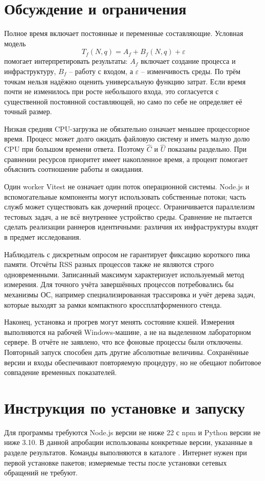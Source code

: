 \section{Обсуждение и ограничения}
Полное время включает постоянные и переменные составляющие. Условная модель
\[
 T_f(N,q)=A_f+B_f(N,q)+\varepsilon
\]
помогает интерпретировать результаты: $A_f$ включает создание процесса и инфраструктуру, $B_f$ -- работу с входом, а $\varepsilon$ -- изменчивость среды. По трём точкам нельзя надёжно оценить универсальную функцию затрат. Если время почти не изменилось при росте небольшого входа, это согласуется с существенной постоянной составляющей, но само по себе не определяет её точный размер.

Низкая средняя CPU-загрузка не обязательно означает меньшее процессорное время. Процесс может долго ожидать файловую систему и иметь малую долю CPU при большом времени ответа. Поэтому $\widehat C$ и $\widehat U$ показаны раздельно. При сравнении ресурсов приоритет имеет накопленное время, а процент помогает объяснить соотношение работы и ожидания.

Один worker Vitest не означает один поток операционной системы. Node.js и вспомогательные компоненты могут использовать собственные потоки; часть служб может существовать как дочерний процесс. Ограничивается параллелизм тестовых задач, а не всё внутреннее устройство среды. Сравнение не пытается сделать реализации раннеров идентичными: различия их инфраструктуры входят в предмет исследования.

Наблюдатель с дискретным опросом не гарантирует фиксацию короткого пика памяти. Отсчёты RSS разных процессов также не являются строго одновременными. Записанный максимум характеризует используемый метод измерения. Для точного учёта завершённых процессов потребовались бы механизмы ОС, например специализированная трассировка и учёт дерева задач, которые выходят за рамки компактного кроссплатформенного стенда.

Наконец, установка и прогрев могут менять состояние кэшей. Измерения выполняются на рабочей Windows-машине, а не на выделенном лабораторном сервере. В отчёте не заявлено, что все фоновые процессы были отключены. Повторный запуск способен дать другие абсолютные величины. Сохранённые версии и входы обеспечивают повторяемую процедуру, но не обещают побитовое совпадение временных показателей.

\section{Инструкция по установке и запуску}
Для программы требуются Node.js версии не ниже 22 с npm и Python версии не ниже 3.10. В данной апробации использованы конкретные версии, указанные в разделе результатов. Команды выполняются в каталоге . Интернет нужен при первой установке пакетов; измеряемые тесты после установки сетевых обращений не требуют.

